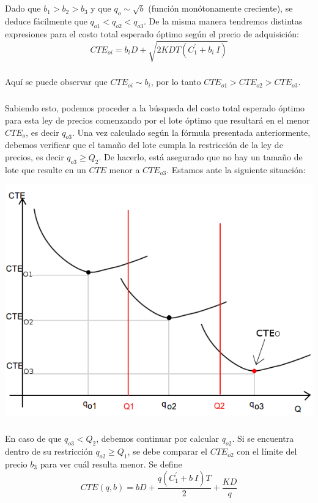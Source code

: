 \documentclass[a4paper,10pt]{article}
\begin{document}
	\subparagraph{} Dado que $b_1 > b_2 > b_3$ y que $q_o \sim \sqrt b$ (función monótonamente creciente), se deduce fácilmente que $q_{o1} < q_{o2} < q_{o3}$. De la misma manera tendremos distintas expresiones para el costo total esperado óptimo según el precio de adquisición:
	$$ CTE_{oi} = b_iD + \sqrt{ 2KDT \left( C_1^{'} + b_i\ I \right) } $$

	\subparagraph{} Aquí se puede observar que $CTE_{oi} \sim b_i$, por lo tanto $CTE_{o1} > CTE_{o2} > CTE_{o3}$.

	\subparagraph{} Sabiendo esto, podemos proceder a la búsqueda del costo total esperado óptimo para esta ley de precios comenzando por el lote óptimo que resultará en el menor $CTE_o$, es decir $q_{o3}$. Una vez calculado según la fórmula presentada anteriormente, debemos verificar que el tamaño del lote cumpla la restricción de la ley de precios, es decir $q_{o3} \geq Q_2$. De hacerlo, está asegurado que no hay un tamaño de lote que resulte en un $CTE$ menor a $CTE_{o3}$. Estamos ante la siguiente situación:

	\begin{center}
	\includegraphics[scale=0.4,keepaspectratio=true]{img/6/6_CTE_3.png} 
	\end{center}

	\subparagraph{} En caso de que $q_{o3} < Q_2$, debemos continuar por calcular $q_{o2}$. Si se encuentra dentro de su restricción $q_{o2} \geq Q_1$, se debe comparar el $CTE_{o2}$ con el límite del precio $b_3$ para ver cuál resulta menor. Se define
	$$ CTE(q,b) = bD + \frac{q \left( C_1^{'} + b\ I \right) T}{2} + \frac{KD}{q} $$
\end{document}
